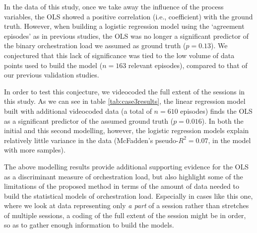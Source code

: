 \documentclass[10pt,journal,compsoc]{IEEEtran}
\begin{document}
In the data of this study, once we take away the influence of the process variables, the OLS showed a positive correlation (i.e., coefficient) with the ground truth. However, when building a logistic regression model using the `agreement episodes' as in previous studies, the OLS was no longer a significant predictor of the binary orchestration load we assumed as ground truth ($p=0.13$). We conjectured that this lack of significance was tied to the low volume of data points used to build the model ($n=163$ relevant episodes), compared to that of our previous validation studies.

In order to test this conjecture, we videocoded the full extent of the sessions in this study. As we can see in table \ref{tab:case3results}, the linear regression model built with additional videocoded data (a total of $n=610$ episodes) finds the OLS as a significant predictor of the assumed ground truth ($p=0.016$). In both the initial and this second modelling, however, the logistic regression models explain relatively little variance in the data (McFadden's pseudo-$R^2=0.07$, in the model with more samples). 

The above modelling results provide additional supporting evidence for the OLS as a discriminant measure of orchestration load, but also highlight some of the limitations of the proposed method in terms of the amount of data needed to build the statistical models of orchestration load. Especially in cases like this one, where we look at data representing only \textit{a part} of a session rather than stretches of multiple sessions, a coding of the full extent of the session might be in order, so as to gather enough information to build the models.
\end{document}
